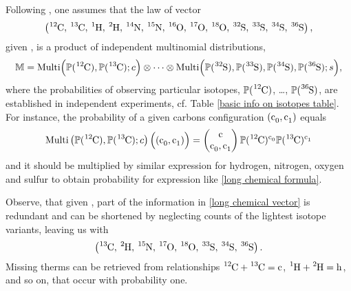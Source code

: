Following \cite{Kienitz1961MassSpectrometry}, one assumes that the law of vector
\begin{equation}\label{long chemical vector}
	\left( \cem{^{12}C},\, \cem{^{13}C},\, \cem{^{1}H},\, \cem{^{2}H},\, \cem{^{14}N},\, \cem{^{15}N},\, \cem{^{16}O},\, \cem{^{17}O},\, \cem{^{18}O},\, \cem{^{32}S},\, \cem{^{33}S},\, \cem{^{34}S},\, \cem{^{36}S} \right),	
\end{equation}
given \molecule, is a product of independent multinomial distributions,
{\small\begin{equation}\label{product of multinomials}
	\MM = \mathrm{Multi} \Big( \prob(\cem{^{12}C}), \prob(\cem{^{13}C}); c \Big)
	\otimes \dots \otimes 
	\mathrm{Multi} \Big( \prob(\cem{^{32}S}), \prob(\cem{^{33}S}), \prob(\cem{^{34}S}), \prob(\cem{^{36}S}); s \Big),	
\end{equation}}
where the probabilities of observing particular isotopes, $\prob(\cem{^{12}C})$, \dots, $\prob(\cem{^{36}S})$, are established in independent experiments, cf. Table \ref{basic info on isotopes table}. For instance, the probability of a given carbons configuration $(\cem{c_0}, \cem{c_1})$ equals
$$
	\mathrm{Multi} \left( \prob(\cem{^{12}C}), \prob(\cem{^{13}C}); c \right)
		\Big( (\cem{c_0}, \cem{c_1}) \Big) = 
	\begin{pmatrix}
		\cem{c} \cr \cem{c_0}, \cem{c_1}  
	\end{pmatrix} \prob(\cem{^{12}C})^\cem{c_0} \prob(\cem{^{13}C})^\cem{c_1}
$$
and it should be multiplied by similar expression for hydrogen, nitrogen, oxygen and sulfur to obtain probability for expression like \eqref{long chemical formula}.


Observe, that given \molecule, part of the information in \eqref{long chemical vector} is redundant and can be shortened by neglecting counts of the lightest isotope variants, leaving us with 
\begin{equation}\label{short chemical vector}
 	\left( \cem{^{13}C},\, \cem{^{2}H},\, \cem{^{15}N},\, \cem{^{17}O},\, \cem{^{18}O},\, \cem{^{33}S},\, \cem{^{34}S},\, \cem{^{36}S} \right).	
\end{equation}
Missing therms can be retrieved from relationships $\cem{^{12}C} + \cem{^{13}C} = \cem{c}$, $\cem{^{1}H} + \cem{^{2}H} = \cem{h}$, and so on, that occur with probability one.

